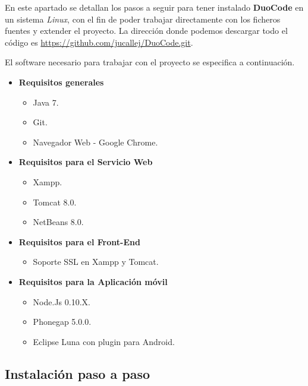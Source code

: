 En este apartado se detallan los pasos a seguir para tener instalado \textbf{DuoCode} en un sistema \textit{Linux}, con el fin de poder trabajar directamente con los ficheros fuentes y extender el proyecto. La dirección donde podemos descargar todo el código es \url{https://github.com/jucallej/DuoCode.git}.

El software necesario para trabajar con el proyecto se especifica a continuación.

\begin{itemize}
\item \textbf{Requisitos generales}
\begin{itemize}
\item Java 7.
\item Git.
\item Navegador Web - Google Chrome.
\end{itemize}
\end{itemize}
\begin{itemize}
\item \textbf{Requisitos para el Servicio Web}
\begin{itemize}
\item Xampp.
\item Tomcat 8.0.
\item NetBeans 8.0.
\end{itemize}
\end{itemize}
\begin{itemize}
\item \textbf{Requisitos para el Front-End}

\begin{itemize}
\item Soporte SSL en Xampp y Tomcat.
\end{itemize}
\end{itemize}
\begin{itemize}
\item \textbf{Requisitos para la Aplicación móvil}
\begin{itemize}
\item Node.Js 0.10.X.
\item Phonegap 5.0.0.
\item Eclipse Luna con plugin para Android.
\end{itemize}
\end{itemize}

\subsection{Instalación paso a paso}


